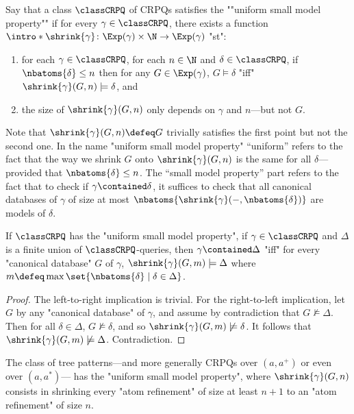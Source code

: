 Say that a class $\classCRPQ$ of CRPQs satisfies the \AP""uniform small model property""
if for every $\gamma \in \classCRPQ$, there exists a function
$\intro*\shrink{\gamma}\colon \Exp(\gamma) \times \N \to \Exp(\gamma)$ "st":
\begin{enumerate}
  \item for each $\gamma \in \classCRPQ$, for each $n \in \N$ and $\delta \in \classCRPQ$,
  if $\nbatoms{\delta} \leq n$ then for any $G \in \Exp(\gamma)$, $G \models \delta$ "iff"
  $\shrink{\gamma}(G, n) \models \delta$, and
  \item the size of $\shrink{\gamma}(G, n)$ only depends on $\gamma$ and $n$---but not $G$.
\end{enumerate} 
Note that $\shrink{\gamma}(G, n) \defeq G$ trivially satisfies the first point but not the second one.
In the name "uniform small model property" ``uniform'' refers to the fact
that the way we shrink $G$ onto $\shrink{\gamma}(G,n)$ is the same for all $\delta$---provided that $\nbatoms{\delta} \leq n$. The ``small model property'' part refers to the fact that to check if
$\gamma \contained \delta$, it suffices to check that all canonical databases of $\gamma$
of size at most $\nbatoms{\shrink{\gamma}(-, \nbatoms{\delta})}$ are models of $\delta$.

\begin{proposition}
  \AP\label{prop:containment-uniform-smp}
  If $\classCRPQ$ has the "uniform small model property", if $\gamma \in \classCRPQ$ and $\Delta$ 
  is a finite union of $\classCRPQ$-queries, then
  $\gamma \contained \Delta$ "iff" for every "canonical database" $G$ of $\gamma$,
  $\shrink{\gamma}(G, m) \models \Delta$
  where $m \defeq \max{\set{\nbatoms{\delta} \mid \delta \in \Delta}}$.
\end{proposition}

\begin{proof}
  The left-to-right implication is trivial. For the right-to-left implication, 
  let $G$ by any "canonical database" of $\gamma$,
  and assume by contradiction that $G \not\models \Delta$.
  Then for all $\delta \in \Delta$, $G \not\models \delta$,
  and so $\shrink{\gamma}(G, m) \not\models \delta$.
  It follows that $\shrink{\gamma}(G, m) \not\models \Delta$.
  Contradiction.
\end{proof}

\begin{proposition}
  \AP\label{prop:tree-patterns-uniform-smp}
  The class of tree patterns---and more generally CRPQs over $(a, a^+)$ or even over $(a, a^*)$---
  has the "uniform small model property", where $\shrink{\gamma}(G, n)$ consists
  in shrinking every "atom refinement" of size at least $n+1$ to an "atom refinement" of
  size $n$.
\end{proposition}

